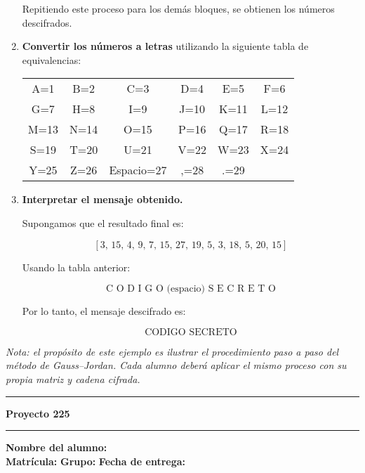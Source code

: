 \documentclass{article}%
\begin{document}
\begin{enumerate}
    Repitiendo este proceso para los demás bloques, se obtienen los números descifrados.

    \item \textbf{Convertir los números a letras} utilizando la siguiente tabla de equivalencias:

    \begin{center}
    \renewcommand{\arraystretch}{1.2}
    \small
    \begin{tabular}{cccccc}
    A=1 & B=2 & C=3 & D=4 & E=5 & F=6 \\
    G=7 & H=8 & I=9 & J=10 & K=11 & L=12 \\
    M=13 & N=14 & O=15 & P=16 & Q=17 & R=18 \\
    S=19 & T=20 & U=21 & V=22 & W=23 & X=24 \\
    Y=25 & Z=26 & Espacio=27 & ,=28 & .=29 &
    \end{tabular}
    \end{center}

    \item \textbf{Interpretar el mensaje obtenido.}

    Supongamos que el resultado final es:

    \[
    [3,\, 15,\, 4,\, 9,\, 7,\, 15,\, 27,\, 19,\, 5,\, 3,\, 18,\, 5,\, 20,\, 15]
    \]

    Usando la tabla anterior:

    \[
    \text{C O D I G O (espacio) S E C R E T O}
    \]

    Por lo tanto, el mensaje descifrado es:

    \[
    \boxed{\text{CODIGO SECRETO}}
    \]
\end{enumerate}

\bigskip
\textit{Nota: el propósito de este ejemplo es ilustrar el procedimiento paso a paso del método de Gauss–Jordan.
Cada alumno deberá aplicar el mismo proceso con su propia matriz y cadena cifrada.}

\bigskip
\hrule
\bigskip%

\newpage
\vspace{0.5em}
\noindent\textbf{Proyecto 225}\\%
\noindent\hrule
\vspace{1em}

\noindent\textbf{Nombre del alumno:} \underline{\hspace{11.8cm}}\\[8pt]
\noindent\textbf{Matrícula:} \underline{\hspace{4cm}} 
\textbf{Grupo:} \underline{\hspace{1.9cm}}
\textbf{Fecha de entrega:} \underline{\hspace{2.5cm}}\\[12pt]
\end{document}
